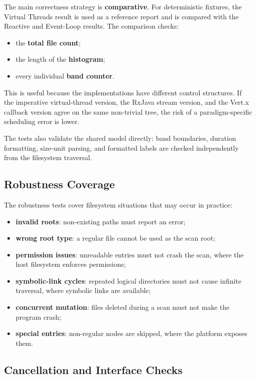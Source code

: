 The main correctness strategy is \textbf{comparative}. For deterministic
fixtures, the Virtual Threads result is used as a reference report and is
compared with the Reactive and Event-Loop results. The comparison checks:

\begin{itemize}
  \item the \textbf{total file count};
  \item the length of the \textbf{histogram};
  \item every individual \textbf{band counter}.
\end{itemize}

This is useful because the implementations have different control structures.
If the imperative virtual-thread version, the RxJava stream version, and the
Vert.x callback version agree on the same non-trivial tree, the risk of a
paradigm-specific scheduling error is lower.

The tests also validate the shared model directly: band boundaries, duration
formatting, size-unit parsing, and formatted labels are checked independently
from the filesystem traversal.

\subsection{Robustness Coverage}

The robustness tests cover filesystem situations that may occur in practice:

\begin{itemize}
  \item \textbf{invalid roots}: non-existing paths must report an error;
  \item \textbf{wrong root type}: a regular file cannot be used as the scan
  root;
  \item \textbf{permission issues}: unreadable entries must not crash the scan,
  where the host filesystem enforces permissions;
  \item \textbf{symbolic-link cycles}: repeated logical directories must not
  cause infinite traversal, where symbolic links are available;
  \item \textbf{concurrent mutation}: files deleted during a scan must not make
  the program crash;
  \item \textbf{special entries}: non-regular nodes are skipped, where the
  platform exposes them.
\end{itemize}

\subsection{Cancellation and Interface Checks}

